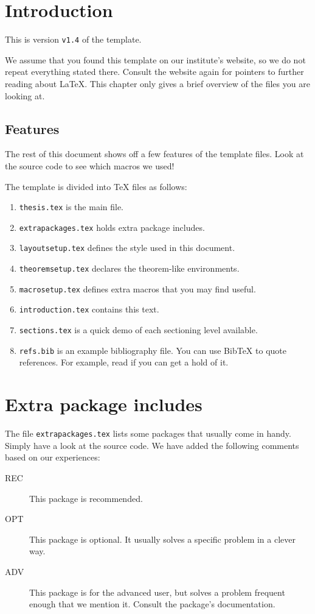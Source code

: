 \newcommand{\package}{\emph}

\chapter{Introduction}

This is version \verb-v1.4- of the template.

We assume that you found this template on our institute's website, so
we do not repeat everything stated there.  Consult the website again
for pointers to further reading about \LaTeX{}.  This chapter only
gives a brief overview of the files you are looking at.

\section{Features}
\label{sec:features}

The rest of this document shows off a few features of the template
files.  Look at the source code to see which macros we used!

The template is divided into \TeX{} files as follows:
\begin{enumerate}
\item \texttt{thesis.tex} is the main file.
\item \texttt{extrapackages.tex} holds extra package includes.
\item \texttt{layoutsetup.tex} defines the style used in this document.
\item \texttt{theoremsetup.tex} declares the theorem-like environments.
\item \texttt{macrosetup.tex} defines extra macros that you may find
  useful.
\item \texttt{introduction.tex} contains this text.
\item \texttt{sections.tex} is a quick demo of each sectioning level
  available.
\item \texttt{refs.bib} is an example bibliography file.  You can use
  Bib\TeX{} to quote references.  For example, read
  \cite{bringhurst1996ets} if you can get a hold of it.
\end{enumerate}


\chapter{Extra package includes}

The file \texttt{extrapackages.tex} lists some packages that usually
come in handy.  Simply have a look at the source code.  We have
added the following comments based on our experiences:
\begin{description}
\item[REC] This package is recommended.
\item[OPT] This package is optional.  It usually solves a specific
  problem in a clever way.
\item[ADV] This package is for the advanced user, but solves a problem
  frequent enough that we mention it. Consult the package's
  documentation.
\end{description}

